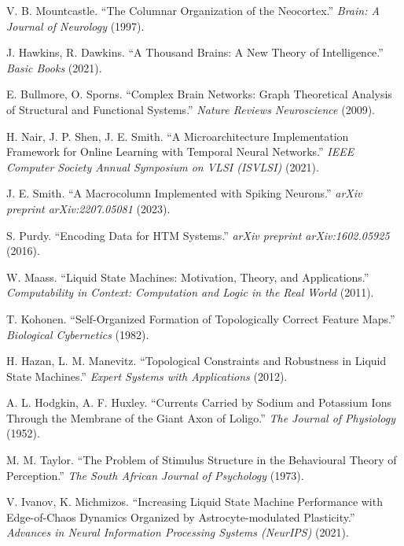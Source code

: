 \begin{thebibliography}{00}

    V. B. Mountcastle.
    ``The Columnar Organization of the Neocortex.''
    \textit{Brain: A Journal of Neurology}
    (1997).

    J. Hawkins, R. Dawkins.
    ``A Thousand Brains: A New Theory of Intelligence.''
    \textit{Basic Books}
    (2021).

    E. Bullmore, O. Sporns.
    ``Complex Brain Networks: Graph Theoretical Analysis of Structural and Functional Systems.''
    \textit{Nature Reviews Neuroscience}
    (2009).

    H. Nair, J. P. Shen, J. E. Smith.
    ``A Microarchitecture Implementation Framework for Online Learning with Temporal Neural Networks.''
    \textit{IEEE Computer Society Annual Symposium on VLSI (ISVLSI)}
    (2021).

    J. E. Smith.
    ``A Macrocolumn Implemented with Spiking Neurons.''
    \textit{arXiv preprint arXiv:2207.05081}
    (2023).

    S. Purdy.
    ``Encoding Data for HTM Systems.''
    \textit{arXiv preprint arXiv:1602.05925}
    (2016).

    W. Maass.
    ``Liquid State Machines: Motivation, Theory, and Applications.''
    \textit{Computability in Context: Computation and Logic in the Real World}
    (2011).

    T. Kohonen.
    ``Self-Organized Formation of Topologically Correct Feature Maps.''
    \textit{Biological Cybernetics}
    (1982).

    H. Hazan, L. M. Manevitz.
    ``Topological Constraints and Robustness in Liquid State Machines.''
    \textit{Expert Systems with Applications}
    (2012).

    A. L. Hodgkin, A. F. Huxley.
    ``Currents Carried by Sodium and Potassium Ions Through the Membrane of the Giant Axon of Loligo.''
    \textit{The Journal of Physiology}
    (1952).

    M. M. Taylor.
    ``The Problem of Stimulus Structure in the Behavioural Theory of Perception.''
    \textit{The South African Journal of Psychology}
    (1973).

    V. Ivanov, K. Michmizos.
    ``Increasing Liquid State Machine Performance with Edge-of-Chaos Dynamics Organized by Astrocyte-modulated Plasticity.''
    \textit{Advances in Neural Information Processing Systems (NeurIPS)}
    (2021).


\end{thebibliography}
